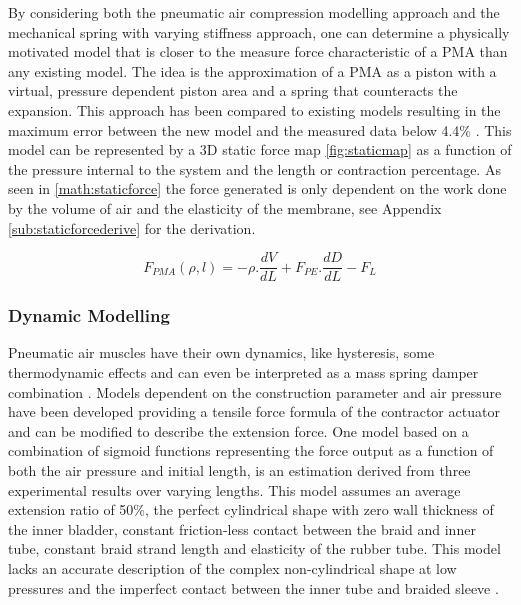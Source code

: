 \documentclass[11pt,a4paper]{article}
\begin{document}
By considering both the pneumatic air compression modelling approach and the mechanical spring with varying stiffness approach, one can determine a physically motivated model that is closer to the measure force characteristic of a PMA than any existing model. The idea is the approximation of a PMA as a piston with a virtual, pressure dependent piston area and a spring that counteracts the expansion. This approach has been compared to existing models resulting in the maximum error between the new model and the measured data below 4.4\% \cite{martens_boblan_2017}. This model can be represented by a 3D static force map \cref{fig:staticmap} as a function of the pressure internal to the system and the length or contraction percentage. As seen in \cref{math:staticforce} the force generated is only dependent on the work done by the volume of air and the elasticity of the membrane, see Appendix \cref{sub:staticforcederive} for the derivation.

\begin{equation}
F_{PMA}(\rho, l) = -\rho.\frac{dV}{dL}+F_{PE}.\frac{dD}{dL}-F_L
\label{math:staticforce}
\end{equation}

\subsubsection{Dynamic Modelling}
\label{sub:dynamic_modelling}
Pneumatic air muscles have their own dynamics, like hysteresis, some thermodynamic effects and can even be interpreted as a mass spring damper combination \cite{martens_boblan_2017}. Models dependent on the construction parameter and air pressure have been developed providing a tensile force formula of the contractor actuator and can be modified to describe the extension force. One model based on a combination of sigmoid functions representing the force output as a function of both the air pressure and initial length, is an estimation derived from three experimental results over varying lengths. This model assumes an average extension ratio of 50\%, the perfect cylindrical shape with zero wall thickness of the inner bladder, constant friction-less contact between the braid and inner tube, constant braid strand length and elasticity of the rubber tube. This model lacks an accurate description of the complex non-cylindrical shape at low pressures and the imperfect contact between the inner tube and braided sleeve \cite{al-ibadi_nefti-meziani_davis_2018}. \newline
\end{document}
